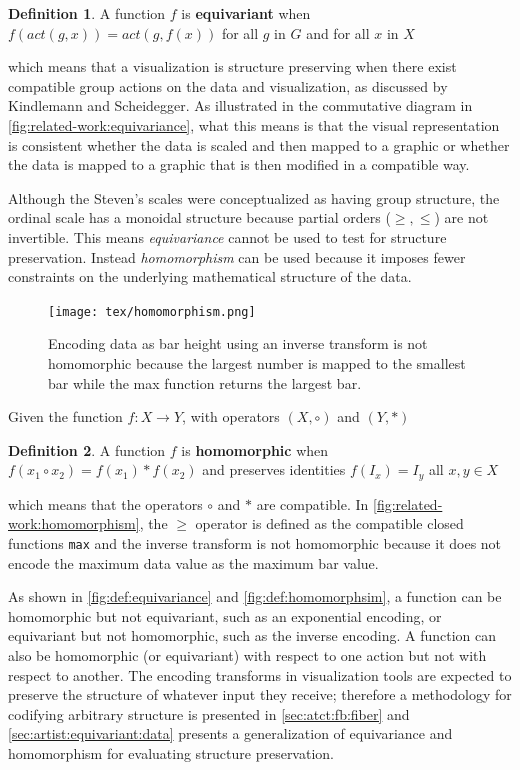 \documentclass[journal]{IEEEtran}
\theoremstyle{definition}
\newtheorem{definition}{Definition}[section]
\theoremstyle{remark}
\begin{document}
\begin{definition}\label{def:equivariance}
 A function $f$ is \textbf{equivariant} when $f(act(g,x)) = act(g,f(x))$ for all $g$ in $G$ and for all $x$ in $X$ \cite{pittsNominalSetsNames2013}
\end{definition}
which means that a visualization is structure preserving when there exist compatible group actions on the data and visualization, as discussed by Kindlemann and Scheidegger\cite{kindlmannAlgebraicProcessVisualization2014}. As illustrated in the commutative diagram in \autoref{fig:related-work:equivariance}, what this means is that the visual representation is consistent whether the data is scaled and then mapped to a graphic or whether the data is mapped to a graphic that is then modified in a compatible way.

Although the Steven's scales were conceptualized as having group structure, the ordinal scale has a monoidal structure because partial orders ($\geq, \leq$) are not invertible. This means \textit{equivariance} cannot be used to test for structure preservation. Instead \textit{homomorphism} can be used because it imposes fewer constraints on the underlying mathematical structure of the data.
\begin{figure}
  \texttt{[image: tex/homomorphism.png]}
  \caption{Encoding data as bar height using an inverse transform is not homomorphic because the largest number is mapped to the smallest bar while the max function returns the largest bar.}
  \label{fig:related-work:homomorphism}
\end{figure}

Given the function $f: X \rightarrow Y$, with operators $(X, \circ)$ and $(Y, *)$

\begin{definition}\label{def:homomorphism}
  A function $f$ is \textbf{homomorphic} when $f(x_1 \circ x_2) = f(x_1) * f(x_2)$ and preserves identities $f(I_x) = I_y$ all $x, y \in X$ \cite{grimaldiDiscreteCombinatorialMathematics2006}
\end{definition}

which means that the operators $\circ$ and $*$ are compatible. In \autoref{fig:related-work:homomorphism}, the $\geq$ operator is defined as the compatible closed functions \texttt{max} and the inverse transform
is not homomorphic because it does not encode the maximum data value as the maximum bar value.

As shown in \autoref{fig:def:equivariance} and \autoref{fig:def:homomorphsim}, a function can be homomorphic but not equivariant, such as an exponential encoding, or equivariant but not homomorphic, such as the inverse encoding. A function can also be homomorphic (or equivariant) with respect to one action but not with respect to another. The encoding transforms in visualization tools are expected to preserve the structure of whatever input they receive; therefore a methodology for codifying arbitrary structure is presented in \autoref{sec:atct:fb:fiber} and \autoref{sec:artist:equivariant:data} presents a generalization of equivariance and homomorphism for evaluating structure preservation.
\end{document}
